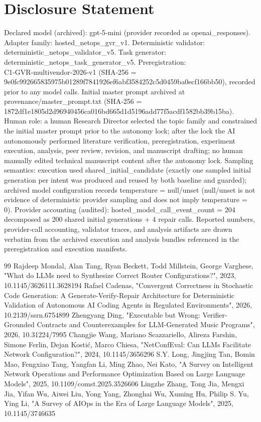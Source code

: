 \documentclass[conference]{IEEEtran}
\begin{document}
\section*{Disclosure Statement}
Declared model (archived): gpt‑5‑mini (provider recorded as openai\_responses). Adapter family: hosted\_netops\_gvr\_v1. Deterministic validator: deterministic\_netops\_validator\_v5. Task generator: deterministic\_netops\_task\_generator\_v5. Preregistration: C1‑GVR‑multivendor‑2026‑v1 (SHA‑256 = 9e0fc992\allowbreak{}66583597\allowbreak{}5b01289f\allowbreak{}7841926e\allowbreak{}f6abf358\allowbreak{}4252c5d0\allowbreak{}459ba0ec\allowbreak{}f166bb50), recorded prior to any model calls. Initial master prompt archived at provenance/master\_prompt.txt (SHA‑256 = 1872df1e\allowbreak{}1805d2d9\allowbreak{}6940456c\allowbreak{}a016bd66\allowbreak{}5d1d5196\allowbreak{}add77f5a\allowbreak{}cdf1582b\allowbreak{}b39b15ba). Human role: a human Research Director selected the topic family and constrained the initial master prompt prior to the autonomy lock; after the lock the AI autonomously performed literature verification, preregistration, experiment execution, analysis, peer review, revision, and manuscript drafting; no human manually edited technical manuscript content after the autonomy lock. Sampling semantics: execution used shared\_initial\_candidate (exactly one sampled initial generation per intent was produced and reused by both baseline and guarded); archived model configuration records temperature = null/unset (null/unset is not evidence of deterministic provider sampling and does not imply temperature = 0). Provider accounting (audited): hosted\_model\_call\_event\_count = 204 decomposed as 200 shared initial generations + 4 repair calls. Reported numbers, provider‑call accounting, validator traces, and analysis artifacts are drawn verbatim from the archived execution and analysis bundles referenced in the preregistration and execution manifests.

\begin{thebibliography}{99}
 Rajdeep Mondal, Alan Tang, Ryan Beckett, Todd Millstein, George Varghese, "What do LLMs need to Synthesize Correct Router Configurations?", 2023, 10.1145/3626111.3628194
 Rafael Cadenas, "Convergent Correctness in Stochastic Code Generation: A Generate-Verify-Repair Architecture for Deterministic Validation of Autonomous AI Coding Agents in Regulated Environments", 2026, 10.2139/ssrn.6754899
 Zhengyang Ding, "Executable but Wrong: Verifier-Grounded Contracts and Counterexamples for LLM-Generated Music Programs", 2026, 10.31224/7995
 Changjie Wang, Mariano Scazzariello, Alireza Farshin, Simone Ferlin, Dejan Kostić, Marco Chiesa, "NetConfEval: Can LLMs Facilitate Network Configuration?", 2024, 10.1145/3656296
 S.Y. Long, Jingjing Tan, Bomin Mao, Fengxiao Tang, Yangfan Li, Ming Zhao, Nei Kato, "A Survey on Intelligent Network Operations and Performance Optimization Based on Large Language Models", 2025, 10.1109/comst.2025.3526606
 Lingzhe Zhang, Tong Jia, Mengxi Jia, Yifan Wu, Aiwei Liu, Yong Yang, Zhonghai Wu, Xuming Hu, Philip S. Yu, Ying Li, "A Survey of AIOps in the Era of Large Language Models", 2025, 10.1145/3746635
\end{thebibliography}
\end{document}
